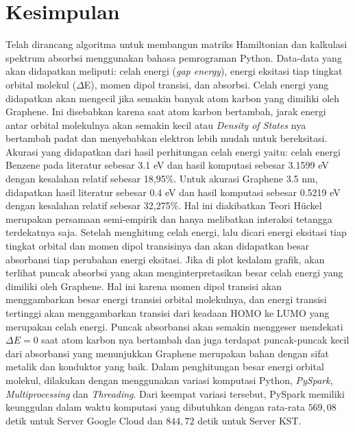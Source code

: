 \documentclass[12pt,a4paper]{report}
\begin{document}
\section{Kesimpulan}
	Telah dirancang algoritma untuk membangun matriks Hamiltonian dan kalkulasi spektrum absorbsi menggunakan bahasa pemrograman Python. Data-data yang akan didapatkan meliputi: celah energi (\textit{gap energy}), energi eksitasi tiap tingkat orbital molekul ($\Delta$E), momen dipol transisi, dan absorbsi. Celah energi yang didapatkan akan mengecil jika semakin banyak atom karbon yang dimiliki oleh Graphene. Ini disebabkan karena saat atom karbon bertambah, jarak energi antar orbital molekulnya akan semakin kecil atau \textit{Density of States} nya bertambah padat dan menyebabkan elektron lebih mudah untuk bereksitasi. Akurasi yang didapatkan dari hasil perhitungan celah energi yaitu: celah energi Benzene pada literatur sebesar 3.1 eV \cite{Masiak2017} dan hasil komputasi sebesar 3.1599 eV dengan kesalahan relatif sebesar 18,95\%. Untuk akurasi Graphene 3.5 nm, didapatkan hasil literatur sebesar 0.4 eV \cite{Jeon2013} dan hasil komputasi sebesar 0.5219 eV dengan kesalahan relatif sebesar 32,275\%. Hal ini diakibatkan Teori Hückel merupakan persamaan semi-empirik dan hanya melibatkan interaksi tetangga terdekatnya saja. Setelah menghitung celah energi, lalu dicari energi eksitasi tiap tingkat orbital dan momen dipol transisinya dan akan didapatkan besar absorbansi tiap perubahan energi eksitasi. Jika di plot kedalam grafik, akan terlihat puncak absorbsi yang akan menginterpretasikan besar celah energi yang dimiliki oleh Graphene. Hal ini karena momen dipol transisi akan menggambarkan besar energi transisi orbital molekulnya, dan energi transisi tertinggi akan menggambarkan transisi dari keadaan HOMO ke LUMO yang merupakan celah energi. Puncak absorbansi akan semakin menggeser mendekati $\Delta E = 0$ saat atom karbon nya bertambah dan juga terdapat puncak-puncak kecil dari absorbansi yang menunjukkan Graphene merupakan bahan dengan sifat metalik dan konduktor yang baik. Dalam penghitungan besar energi orbital molekul, dilakukan dengan menggunakan variasi komputasi Python, \textit{PySpark}, \textit{Multiprocessing} dan \textit{Threading}. Dari keempat variasi tersebut, PySpark memiliki keunggulan dalam waktu komputasi yang dibutuhkan dengan rata-rata $569,08$ detik untuk Server Google Cloud dan $844,72$ detik untuk Server KST. 
\end{document}
